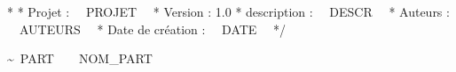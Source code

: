 \/*
	* Projet : ~~PROJET~~
	* Version : 1.0
	* description : ~~DESCR~~
	* Auteurs : ~~AUTEURS~~
	* Date de création : ~~DATE~~
	*/

\~~PART~~{~~NOM_PART~~}






